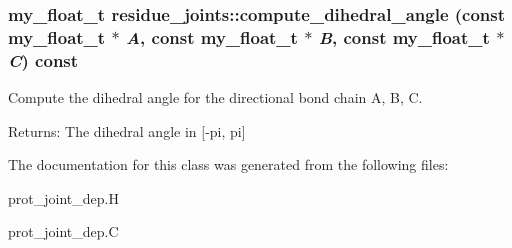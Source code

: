 \subsubsection{\setlength{\rightskip}{0pt plus 5cm}my\_\-float\_\-t residue\_\-joints::compute\_\-dihedral\_\-angle (const my\_\-float\_\-t $\ast$ {\em A}, const my\_\-float\_\-t $\ast$ {\em B}, const my\_\-float\_\-t $\ast$ {\em C}) const\hspace{0.3cm}{\tt  [private]}}\label{classSimSite3D_1_1residue__joints_23107db1da4a4930345c2d1dacd44194}


Compute the dihedral angle for the directional bond chain A, B, C. 

\begin{Desc}
\item[Returns:]The dihedral angle in [-pi, pi] \end{Desc}


The documentation for this class was generated from the following files:\begin{CompactItemize}
\item 
prot\_\-joint\_\-dep.H\item 
prot\_\-joint\_\-dep.C\end{CompactItemize}
